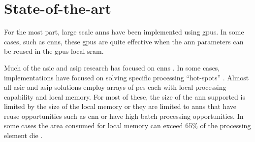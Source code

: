 
\chapter{State-of-the-art}
\label{sec:State of the art}

For the most part, large scale \acp{ann} have been implemented using \acp{gpu}.
In some cases, such as \acp{cnn}, these \acp{gpu} are quite effective when the \ac{ann} parameters can be reused in the \acp{gpu} local \ac{sram}.

Much of the \ac{asic} and \ac{asip} research has focused on \acp{cnn} \cite{chen201614}\cite{farabet2011neuflow}\cite{azarkhish2017neurostream}. 
In some cases, implementations have focused on solving specific processing ``hot-spots'' \cite{chen201614}.
Almost all \ac{asic} and \ac{asip} solutions employ arrays of \acp{pe} each with local processing capability and local memory.
For most of these, the size of the \ac{ann} supported is limited by the size of the local memory or they are limited to \acp{ann} that have reuse opportunities such as \ac{cnn} or have high batch processing opportunities.
In some cases \iffalse, as seen in \fref{fig:Example state-of-the-art die}\fi the area consumed for local memory can exceed 65\% of the 
processing element die \cite{kim2016neurocube}\cite{chen2014diannao}.

